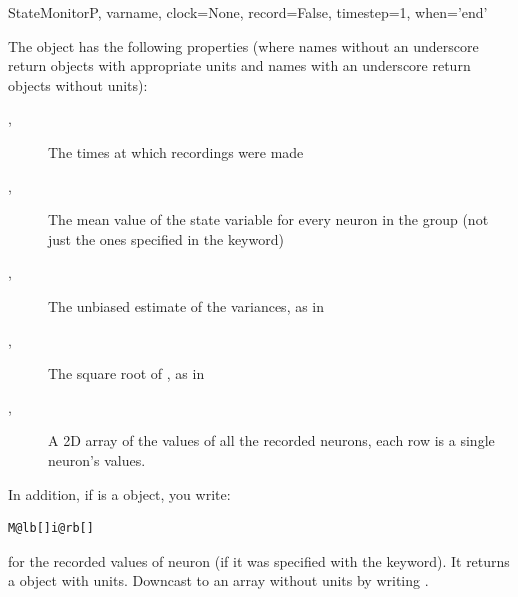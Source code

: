 \documentclass[letterpaper,10pt]{manual}
\begin{document}
\begin{classdesc}{StateMonitor}{P, varname, clock=None, record=False, timestep=1, when='end'}
\begin{description}
\end{description}

The \hyperlink{brian.StateMonitor}{} object has the following properties (where names
without an underscore return  objects with appropriate
units and names with an underscore return  objects without
units):
\begin{description}
\item[, ]
The times at which recordings were made

\item[, ]
The mean value of the state variable for every neuron in the
group (not just the ones specified in the  keyword)

\item[, ]
The unbiased estimate of the variances, as in 

\item[, ]
The square root of , as in 

\item[, ]
A 2D array of the values of all the recorded neurons, each row is a
single neuron's values.

\end{description}

In addition, if  is a \hyperlink{brian.StateMonitor}{} object, you write:

\begin{Verbatim}[commandchars=@\[\]]
M@lb[]i@rb[]
\end{Verbatim}

for the recorded values of neuron  (if it was specified with the
 keyword). It returns a  object with units. Downcast
to an array without units by writing .
\end{classdesc}
\end{document}

